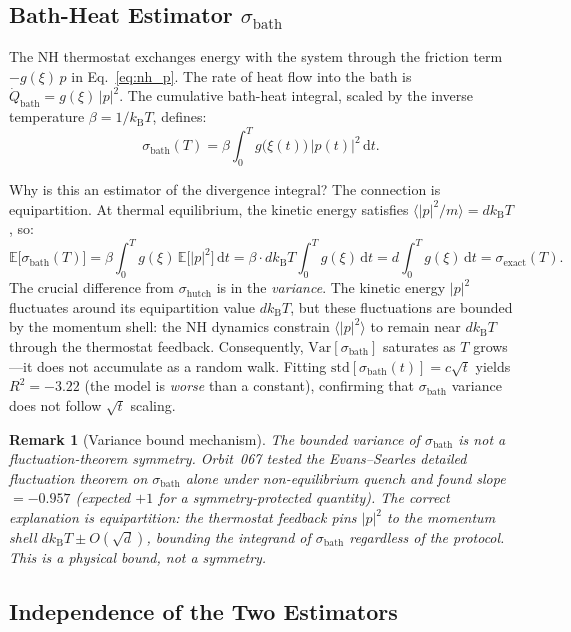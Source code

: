 \documentclass[11pt]{article}
\newtheorem{remark}{Remark}
\newcommand{\E}{\mathbb{E}}
\newcommand{\Var}{\mathrm{Var}}
\newcommand{\dd}{\mathrm{d}}
\newcommand{\kT}{k_{\mathrm{B}}T}
\newcommand{\sbath}{\sigma_{\mathrm{bath}}}
\newcommand{\shutch}{\sigma_{\mathrm{hutch}}}
\newcommand{\sexact}{\sigma_{\mathrm{exact}}}
\begin{document}
\subsection{Bath-Heat Estimator $\sbath$}
\label{sec:bath_estimator}

The NH thermostat exchanges energy with the system through the friction term
$-g(\xi)\,p$ in Eq.~\eqref{eq:nh_p}. The rate of heat flow into the bath is
$\dot{Q}_{\mathrm{bath}} = g(\xi)\,|p|^2$. The cumulative bath-heat integral,
scaled by the inverse temperature $\beta = 1/\kT$, defines:
\begin{equation}
  \sbath(T) = \beta \int_0^T g\bigl(\xi(t)\bigr)\,|p(t)|^2\,\dd t.
  \label{eq:sigma_bath}
\end{equation}

Why is this an estimator of the divergence integral? The connection is
equipartition. At thermal equilibrium, the kinetic energy satisfies
$\langle |p|^2/m \rangle = d\kT$, so:
\begin{equation}
  \E\bigl[\sbath(T)\bigr]
  = \beta \int_0^T g(\xi)\,\E\bigl[|p|^2\bigr]\,\dd t
  = \beta \cdot d\kT \int_0^T g(\xi)\,\dd t
  = d \int_0^T g(\xi)\,\dd t
  = \sexact(T).
  \label{eq:bath_unbiased}
\end{equation}
The crucial difference from $\shutch$ is in the \emph{variance}. The kinetic
energy $|p|^2$ fluctuates around its equipartition value $d\kT$, but these
fluctuations are bounded by the momentum shell: the NH dynamics constrain
$\langle |p|^2 \rangle$ to remain near $d\kT$ through the thermostat feedback.
Consequently, $\Var[\sbath]$ saturates as $T$ grows---it does not accumulate
as a random walk. Fitting $\text{std}[\sbath(t)] = c\sqrt{t}$ yields
$R^2 = -3.22$ (the model is \emph{worse} than a constant), confirming that
$\sbath$ variance does not follow $\sqrt{t}$ scaling.

\begin{remark}[Variance bound mechanism]
The bounded variance of $\sbath$ is \emph{not} a fluctuation-theorem symmetry.
Orbit~067 tested the Evans--Searles detailed fluctuation theorem on $\sbath$
alone under non-equilibrium quench and found slope $= -0.957$ (expected $+1$
for a symmetry-protected quantity). The correct explanation is equipartition:
the thermostat feedback pins $|p|^2$ to the momentum shell $d\kT \pm O(\sqrt{d})$,
bounding the integrand of $\sbath$ regardless of the protocol. This is a
physical bound, not a symmetry.
\end{remark}

\subsection{Independence of the Two Estimators}
\end{document}
